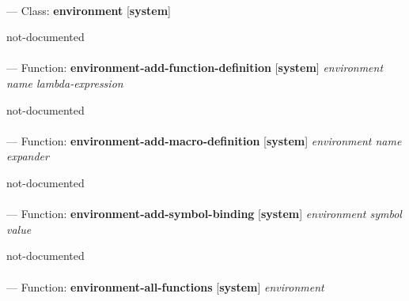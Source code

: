 \paragraph{}
\label{SYSTEM:ENVIRONMENT}
--- Class: \textbf{environment} [\textbf{system}] \textit{}

\begin{adjustwidth}{5em}{5em}
not-documented
\end{adjustwidth}

\paragraph{}
\label{SYSTEM:ENVIRONMENT-ADD-FUNCTION-DEFINITION}
--- Function: \textbf{environment-add-function-definition} [\textbf{system}] \textit{environment name lambda-expression}

\begin{adjustwidth}{5em}{5em}
not-documented
\end{adjustwidth}

\paragraph{}
\label{SYSTEM:ENVIRONMENT-ADD-MACRO-DEFINITION}
--- Function: \textbf{environment-add-macro-definition} [\textbf{system}] \textit{environment name expander}

\begin{adjustwidth}{5em}{5em}
not-documented
\end{adjustwidth}

\paragraph{}
\label{SYSTEM:ENVIRONMENT-ADD-SYMBOL-BINDING}
--- Function: \textbf{environment-add-symbol-binding} [\textbf{system}] \textit{environment symbol value}

\begin{adjustwidth}{5em}{5em}
not-documented
\end{adjustwidth}

\paragraph{}
\label{SYSTEM:ENVIRONMENT-ALL-FUNCTIONS}
--- Function: \textbf{environment-all-functions} [\textbf{system}] \textit{environment}

